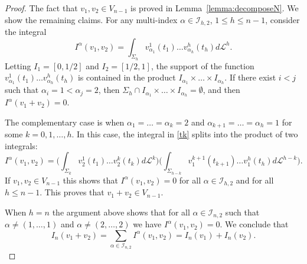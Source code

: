 \documentclass[12pt, reqno]{amsart}
\theoremstyle{plain}
\theoremstyle{definition}
\theoremstyle{remark}
\numberwithin{equation}{section}
\renewcommand{\L}{\mathcal{L}}
\newcommand{\I}{\mathcal{I}}
\newcommand{\0}{\theta}
\renewcommand{\a}{\alpha}
\newcommand{\1}{{-1}}
\renewcommand{\=}{\coloneqq}
\renewcommand{\.}{\dots}
\begin{document}
\begin{proof} The fact that $v_1,v_2\in V_{n-1}$ is proved in Lemma~\ref{lemma:decomposeN}.
We show the remaining claims. For any multi-index $\a\in \I_{h,2}$, $1\leq h\leq n-1$, consider the integral 
\begin{equation}\label{tk}
  I^\a(v_1,v_2) = \int _{\Sigma _h} v^1_ {\a_1}(t_1)    \dots v^h_ {\a_h}(t_h)d\L^h.
\end{equation}
Letting $I_1=[0,1/2]$ and $I_2 =[1/2,1]$, the support of the function $v^1_ {\a_1}(t_1)\dots  v^h_ {\a_h}(t_h) $ is contained in the product 
$I_{\a_1}\times \dots\times  I_{\a_h}$. If there exist $i<j$ such that $\a_i= 1<  \a_j =2$, then %
$
\Sigma_h \cap I_{\a_1}\times \dots\times  I_{\a_h}= \emptyset$, and then $I^{\a}(v_1+v_2)=0$.

The complementary case is when $\a_1=\dots=\a_{k} = 2$ and $\a_{k+1}=\dots=\a_h=1$ for some $k=0,1,\dots, h$.
In this case, 
the integral in \eqref{tk}  splits
into the product of two integrals: 
\[
  I^\a(v_1,v_2) = \Big( \int_{\Sigma_ k }  v^1_ {2}(t_1)    \dots v^k_ {2}(t_k)d\L^k\Big) 
  \Big( \int _{\Sigma_{h-k}} v^{k+1} _ {1}(t_{k+1})    \dots v^h_ {1}  (t_h)d\L^{h-k}\Big) .
\]
If $v_1,v_2\in V_{n-1}$ this shows that $ I^\a(v_1,v_2) =0$ for all $\a \in \I_{h,2}$ and for all $h\leq n-1$.
This proves that $v_1+v_2\in V_{n-1}$.

When $h = n$ the argument above shows that for all $\a\in \I_{n,2}$ such that $\a\neq (1,\dots,1)$ and $\a\neq (2,\dots,2)$ we have
$ I^\a(v_1,v_2)=0$. We conclude that
\[
I_n (v_1+v_2) = \sum_{\a \in \I_{n,2} } I^\a(v_1,v_2) = I_n(v_1) + I_n(v_2).
\]
 \end{proof}








 







 
 
 
 
 
 
 
 
 
 
 
 
 
 
 
 
 
 
 
 
 
 
 
 
\end{document}
